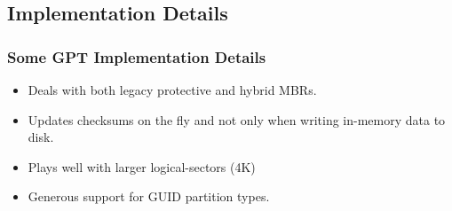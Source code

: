 \subsection{Implementation Details}
\begin{frame}\frametitle{Some GPT Implementation Details}
  \begin{itemize}
  \item Deals with both legacy protective and hybrid MBRs.
  \item Updates checksums on the fly and not only when writing in-memory data to disk.
  \item Plays well with larger logical-sectors (4K)
  \item Generous support for GUID partition types.
  \end{itemize}
\end{frame}
